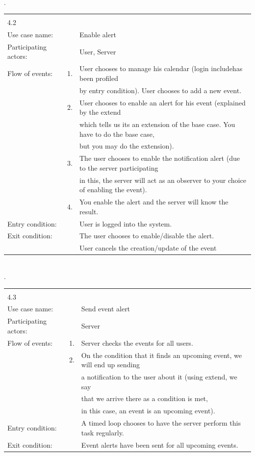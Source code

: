 \documentclass[a4paper]{article}
\begin{document}
	\\
	.\\
\begin{tabular}{l r @{} l}
	\multicolumn{2}{c}{} \\
	4.2&&\\
	\hline
	Use case name:	&&Enable alert\\
	\hline
	Participating actors:&&User, Server \\
	\hline
	Flow of events:	&1.&User chooses to manage his calendar (login \flqq include\frqq has been profiled\\
				&&by entry condition). User chooses to add a new event.\\
				&2.&User chooses to enable an alert for his event (explained by the \flqq extend\frqq\\
					&& which tells us its an extension of the base case. You have to do the base case,\\
					&& but you may do the extension).\\
				&3.&The user chooses to enable the notification alert (due to the server participating\\
					&& in this, the server will act as an observer to your choice of enabling the event).\\
				&4.&You enable the alert and the server will know the result.\\
	\hline
	Entry condition:	&&User is logged into the system.\\
	\hline
	Exit condition:	&&The user chooses to enable/disable the alert.\\
    &&User cancels the creation/update of the event\\
	\hline
\end{tabular}
	\\
	.\\
\begin{tabular}{l r @{} l}
	\multicolumn{2}{c}{} \\
	4.3&&\\
	\hline
	Use case name:	&&Send event alert\\
	\hline
	Participating actors:&&Server\\
	\hline
	Flow of events:	&1.&Server checks the events for all users.\\
				&2.&On the condition that it finds an upcoming event, we will end up sending\\
					&&a notification to the user about it (using \flqq extend\frqq, we say\\
					&&that we arrive there as a condition is met,\\
					&&in this case, an event is an upcoming event).\\
	\hline
	Entry condition:	&&A timed loop chooses to have the server perform this task regularly.\\
	\hline
	Exit condition:	&&Event alerts have been sent for all upcoming events.\\
	\hline
\end{tabular}
\end{document}
